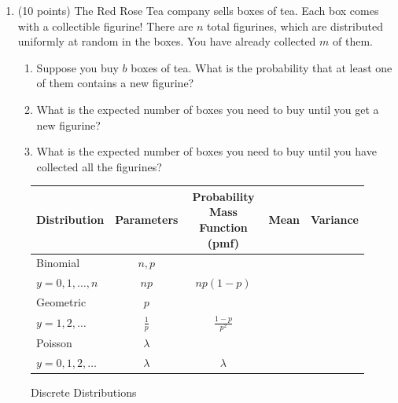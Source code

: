 \documentclass[12pt]{article}
\begin{document}
\begin{enumerate}
\pagebreak

\item (10 points) The Red Rose Tea company sells boxes of tea. Each box comes with a collectible figurine! There are $n$ total figurines, which are distributed uniformly at random in the boxes. You have already collected $m$ of them.
\begin{enumerate}
\item Suppose you buy $b$ boxes of tea. What is the probability that at least one of them contains a new figurine?
\item What is the expected number of boxes you need to buy until you get a new figurine?
\item What is the expected number of boxes you need to buy until you have collected all the figurines? 
\end{enumerate}

\end{enumerate}

\pagebreak


\begin{figure}[H]
\caption{Discrete Distributions}
\begin{tabular}{l c c c c}
\hline
Distribution & Parameters & Probability Mass Function (pmf) & Mean & Variance \\
\hline
Binomial & $n, p$ & \makecell{ $\displaystyle p(y) = \binom{n}{y}p^y(1-p)^{n-y}$\\$ \displaystyle y = 0, 1, \dots, n$} & $np$ & $np(1-p)$ \\
Geometric & $p$ & \makecell{ $\displaystyle p(y) = (1-p)^{y-1}p$ \\ $y = 1, 2, \dots$} & $ \displaystyle \frac{1}{p}$ & $\displaystyle \frac{1 - p}{p^2}$ \\
Poisson & $\lambda$ & \makecell{ $\displaystyle p(y) = \frac{e^{-\lambda} \lambda^y }{y!}$ \\ $y = 0, 1, 2, \dots$ } & $\lambda$ & $\lambda$ \\
\end{tabular}
\end{figure}

\vspace{2cm}
\end{document}
